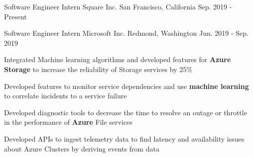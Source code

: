 


\begin{cventries}

\begin{comment}
\cventry
{Software Engineer Intern}
{Microsoft}
{Redmond, Washington}
{Jun. 2018 - Sep. 2018}
{
\begin{cvitems}
\item {Will develop on the frameworks team}
\end{cvitems}
}
\end{comment}

\cventry
	{Software Engineer Intern}
	{Square Inc.}
	{San Francisco, California}
	{Sep. 2019 - Present}
{								
	\begin{cvitems} 
	\end{cvitems}
}

\cventry
	{Software Engineer Intern}
	{Microsoft Inc.}
	{Redmond, Washington}
	{Jun. 2019 - Sep. 2019}
{								
	\begin{cvitems} 
        \item {Integrated Machine learning algorithms and developed features for \textbf{Azure Storage} to increase the reliability of Storage services by 25\%}
                \item {Developed features to monitor service dependencies and use \textbf{machine learning} to correlate incidents to a service failure}
                \item {Developed diagnostic tools to decrease the time to resolve an outage or throttle in the performance of \textbf{Azure} File services}
                \item {Developed APIs to ingest telemetry data to find latency and availability issues about Azure Clusters by deriving events from data}
	\end{cvitems}
}


\end{cventries}

